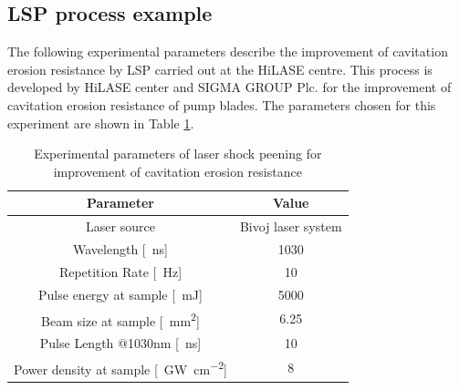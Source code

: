 \subsection{LSP process example}

The following experimental parameters describe the improvement of cavitation erosion resistance by LSP carried out at the HiLASE centre. This process is developed by HiLASE center and SIGMA GROUP Plc. for the improvement of cavitation erosion resistance of pump blades. The parameters chosen for this experiment are shown in Table \ref{experimentalparameters}. 

\begin{table}[h!]
\centering
    \begin{threeparttable}
        \begin{tabular}{|c | c|} 
        \hline
            \textbf{Parameter} & \textbf{Value} \\ [0.5ex] 
        \hline
        Laser source & Bivoj laser system  \\
        \hline
        Wavelength [\SI{}{\nano\second}] & 1030 \\
        \hline
        Repetition Rate [\SI{}{\hertz}] & 10  \\ 
        \hline
            Pulse energy at sample [\SI{}{\milli\joule}] & 5000 \\
        \hline
            Beam size at sample [\SI{}{\mm\squared}] & 6.25 \\
        \hline
            Pulse Length @1030nm [\SI{}{\nano\second}] & 10 \\
        \hline
            Power density at sample [\SI{}{\giga\watt\per\cm\squared}] & 8 \\

        \hline
        \end{tabular}

        \caption[Experimental parameters of laser shock peening]{Experimental parameters of laser shock peening for improvement of cavitation erosion resistance}
        \label{experimentalparameters}
    \end{threeparttable}
\end{table}


